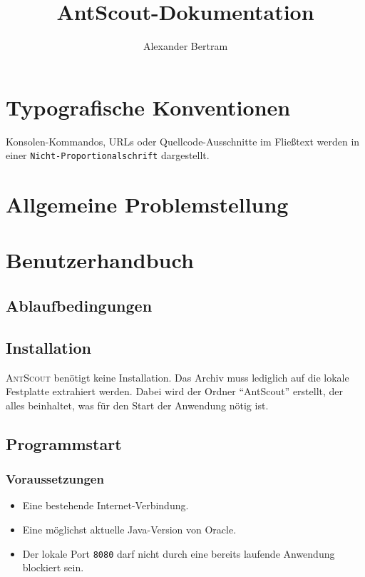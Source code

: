 \documentclass[a4paper,10pt]{scrreprt}
\title{AntScout-Dokumentation}
\author{Alexander Bertram}
\begin{document}
\maketitle

\chapter{Typografische Konventionen}
\label{chap:typografische-konventionen}

Konsolen-Kommandos, URLs oder Quellcode-Ausschnitte im Fließtext werden in einer \texttt{Nicht-Proportionalschrift} dargestellt.

\chapter{Allgemeine Problemstellung}
\label{chap:allgemeine-problemstellung}

\chapter{Benutzerhandbuch}
\label{chap:benutzerhandbuch}

\section{Ablaufbedingungen}
\label{sec:ablaufbedingungen}

\section{Installation}
\label{sec:installation}

\textsc{AntScout} benötigt keine Installation.
Das Archiv muss lediglich auf die lokale Festplatte extrahiert werden.
Dabei wird der Ordner ``AntScout'' erstellt, der alles beinhaltet, was für den Start der Anwendung nötig ist.

\section{Programmstart}
\label{sec:programmstart}

\subsection{Voraussetzungen}
\label{sec:voraussetzungen}

\begin{itemize}
  \item Eine bestehende Internet-Verbindung.
  \item Eine möglichst aktuelle Java-Version von Oracle.
  \item Der lokale Port \texttt{8080} darf nicht durch eine bereits laufende Anwendung blockiert sein.
\end{itemize}
\end{document}
